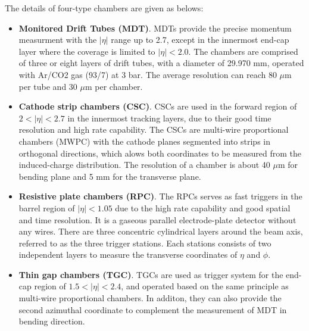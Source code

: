 The details of four-type chambers are given as belows:
\begin{itemize}
	\item \textbf{Monitored Drift Tubes (MDT)}. MDTs provide the precise momentum measurment with the $|\eta|$ range up to 2.7, except in the innermost end-cap layer where the coverage is limited to $|\eta| < 2.0$. The chambers are comprised of three or eight layers of drift tubes, with a diameter of 29.970 mm, operated with Ar/CO2 gas (93/7) at 3 bar. The average resolution can reach 80 $\mu$m per tube and 30 $\mu$m per chamber.
	\item \textbf{Cathode strip chambers (CSC)}. CSCs are used in the forward region of $2 < |\eta| < 2.7$ in the innermost tracking layers, due to their good time resolution and high rate capability. The CSCs are multi-wire proportional chambers (MWPC) with the cathode planes segmented into strips in orthogonal directions, which alows both coordinates to be measured from the induced-charge distribution. The resolution of a chamber is about 40 $\mu$m for bending plane and 5 mm for the transverse plane.
	\item \textbf{Resistive plate chambers (RPC)}. The RPCs serves as fast triggers in the barrel region of $|\eta| < 1.05$ due to the high rate capability and good spatial and time resolution. It is a gaseous parallel electrode-plate detector without any wires. There are three concentric cylindrical layers around the beam axis, referred to as the three trigger stations. Each stations consists of two independent layers to measure the transverse coordinates of $\eta$ and $\phi$.
	\item \textbf{Thin gap chambers (TGC)}. TGCs are used as trigger system for the end-cap region of $1.5 < |\eta| < 2.4$, and operated based on the same principle as multi-wire proportional chambers. In additon, they can also provide the second azimuthal coordinate to complement the measurement of MDT in bending direction.
\end{itemize}
